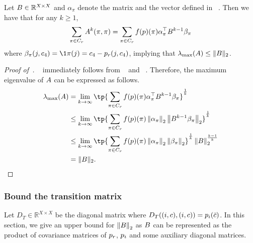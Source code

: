 \begin{lemma}\label{lem:convert_A_to_B}
    Let $\*B \in \mathbb R^{X\times X}$ and $\alpha_\pi$ denote the matrix and the vector defined in ~.
    Then we have that for any $k\geq 1$,
    \begin{align}\label{eq:lem8}
        \sum_{\pi\in C_r}\*A^k(\pi,\pi)
        = \sum_{\pi\in C_r}f(\*p)(\pi)\alpha_\pi^\top \*B^{k-1}\beta_\pi
    \end{align}
    where $\beta_\pi(j,c_4) = \1{\pi(j) = c_4} - \*p_r(j,c_4)$, implying that $\lambda_{\max}(\*A) \leq \|\*B\|_2$.
\end{lemma}
\begin{proof}[Proof of~]
    ~ immediately follows from ~ and ~.
    Therefore, the maximum eigenvalue of $\*A$ can be expressed as follows.
    \begin{align*}
        \lambda_{\max}(\*A) &= \lim_{k\to \infty}\tp{\sum_{\pi\in C_r}f(\*p)(\pi)\alpha_\pi^\top \*B^{k-1}\beta_\pi}^{\frac 1k}
        \\&\leq \lim_{k\to \infty}\tp{\sum_{\pi\in C_r}f(\*p)(\pi)\norm{\alpha_\pi}_2 \norm{\*B^{k-1}\beta_\pi}_2}^{\frac 1k}
        \\&\leq \lim_{k\to \infty}\tp{\sum_{\pi\in C_r}f(\*p)(\pi)\norm{\alpha_\pi}_2 \norm{\beta_\pi}_2}^{\frac 1k} \norm{\*B}_2^{\frac{k-1}{k}}
        \\&= \|\*B\|_2.
    \end{align*}
\end{proof}
\subsubsection{Bound the transition matrix} \label{sec:bound_Jac}
Let $D_T\in \mathbb{R}^{X\times X}$ be the diagonal matrix where $D_T((i,c),(i,c)) = \*p_i(\bar{c})$.
In this section, we give an upper bound for $\norm{\*B}_2$ as $\*B$ can be represented as the product of covariance matrices of $\*p_r$, $\*p_i$ and some auxiliary diagonal matrices.

